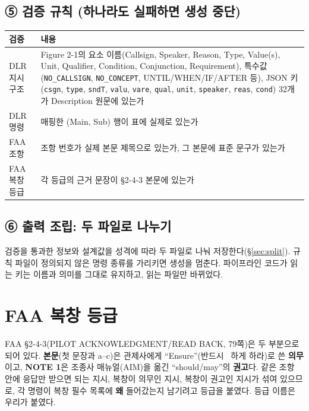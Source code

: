 \documentclass[10pt,a4paper]{article}
\newcommand{\key}[1]{\texttt{\small #1}}
\begin{document}
\subsection{⑤ 검증 규칙 (하나라도 실패하면 생성 중단)}
\begin{center}\small
\begin{tabularx}{\textwidth}{@{}l>{\raggedright\arraybackslash}X@{}}
\toprule
검증 & 내용\\\midrule
DLR 지시 구조 & Figure 2-1의 요소 이름(Callsign, Speaker, Reason, Type, Value(s), Unit, Qualifier, Condition, Conjunction, Requirement), 특수값(\texttt{NO\_CALLSIGN}, \texttt{NO\_CONCEPT}, UNTIL/WHEN/IF/AFTER 등), JSON 키(\key{csgn}, \key{type}, \key{sndT}, \key{valu}, \key{vare}, \key{qual}, \key{unit}, \key{speaker}, \key{reas}, \key{cond}) 32개가 Description 원문에 있는가\\
DLR 명령 & 매핑한 (Main, Sub) 행이 표에 실제로 있는가\\
FAA 조항 & 조항 번호가 실제 본문 제목으로 있는가, 그 본문에 표준 문구가 있는가\\
FAA 복창 등급 & 각 등급의 근거 문장이 §2-4-3 본문에 있는가\\
\bottomrule
\end{tabularx}
\end{center}

\subsection{⑥ 출력 조립: 두 파일로 나누기}
검증을 통과한 정보와 설계값을 성격에 따라 두 파일로 나눠 저장한다(\S\ref{sec:split}). 규칙 파일이 정의되지 않은 명령 종류를 가리키면 생성을 멈춘다. 파이프라인 코드가 읽는 키는 이름과 의미를 그대로 유지하고, 읽는 파일만 바뀌었다.

\section{FAA 복창 등급}\label{sec:levels}
FAA §2-4-3(PILOT ACKNOWLEDGMENT/READ BACK, 79쪽)은 두 부분으로 되어 있다. \textbf{본문}(첫 문장과 a--c)은 관제사에게 ``Ensure''(반드시 ~하게 하라)로 쓴 \textbf{의무}이고, \textbf{NOTE 1}은 조종사 매뉴얼(AIM)을 옮긴 ``should/may''의 \textbf{권고}다. 같은 조항 안에 응답만 받으면 되는 지시, 복창이 의무인 지시, 복창이 권고인 지시가 섞여 있으므로, 각 명령이 복창 필수 목록에 \textbf{왜} 들어갔는지 남기려고 등급을 붙였다. 등급 이름은 우리가 붙였다.
\end{document}
